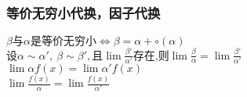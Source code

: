 \subsubsection{等价无穷小代换，因子代换}
$\beta\mbox{与}\alpha\mbox{是等价无穷小}\Leftrightarrow\beta=\alpha +\circ \left(\alpha\right)$\\
$\mbox{设}\alpha \sim \alpha',\ \beta \sim \beta',\mbox{且}\lim\frac{\beta'}{\alpha'}\mbox{存在,则}\lim\frac{\beta}{\alpha}=\lim\frac{\beta'}{\alpha'}$ \\
$\lim\alpha f(x)=\lim\alpha'f(x)$\\
$\lim\frac{f(x)}{\alpha} =\lim\frac{f(x)}{\alpha'}$